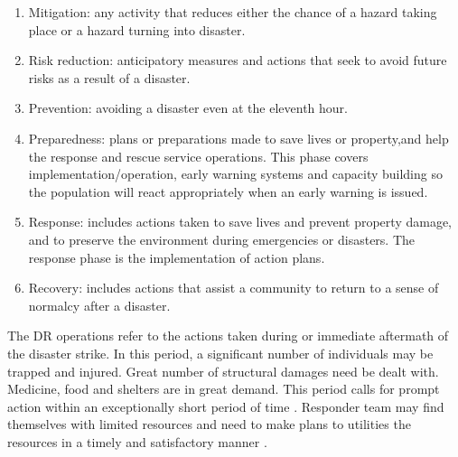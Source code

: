 \begin{enumerate}
\item Mitigation: any activity that reduces either the chance of a hazard taking place or a hazard turning into disaster.
\item Risk reduction: anticipatory measures and actions that seek to avoid future risks as a result of a disaster.
\item Prevention: avoiding a disaster even at the eleventh hour. 
\item Preparedness: plans or preparations made to save lives or property,and help the response and rescue service operations. This phase covers implementation/operation, early warning systems and capacity building so the population will react appropriately when an early warning is issued.
\item Response: includes actions taken to save lives and prevent property damage, and to preserve the environment during emergencies or disasters. The response phase is the implementation of action plans.
\item Recovery: includes actions that assist a community to return to a sense of normalcy after a disaster.
\end{enumerate}

The \ac{DR} operations refer to the actions taken during or immediate aftermath of the disaster strike. In this period, a significant number of individuals may be trapped and injured. Great number of structural damages need be dealt with. Medicine, food and shelters are in great demand. This period calls for prompt action within an exceptionally short period of time \cite{Wattegama2012}. Responder team may find themselves with limited resources and need to make plans to utilities the resources in a timely and satisfactory manner \cite{Chen2005,Chen2008}. \\



